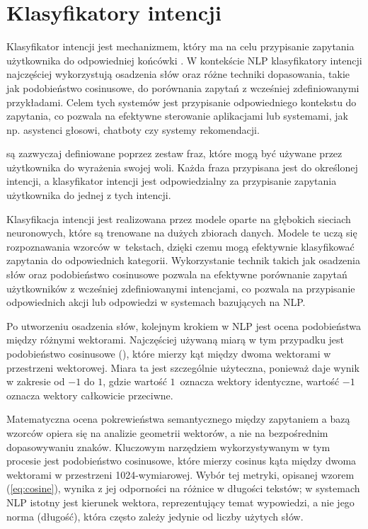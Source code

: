	\section{Klasyfikatory intencji}
	Klasyfikator intencji jest mechanizmem, który ma na celu przypisanie zapytania użytkownika do odpowiedniej końcówki \cite{aggarwal2018textbook}. W kontekście NLP klasyfikatory intencji najczęściej wykorzystują osadzenia słów oraz różne techniki dopasowania, takie jak podobieństwo cosinusowe, do porównania zapytań z wcześniej zdefiniowanymi przykładami. Celem tych systemów jest przypisanie odpowiedniego kontekstu do zapytania, co pozwala na efektywne sterowanie aplikacjami lub systemami, jak np. asystenci głosowi, chatboty czy systemy rekomendacji.
	
	 są zazwyczaj definiowane poprzez zestaw fraz, które mogą być używane przez użytkownika do wyrażenia swojej woli. Każda fraza przypisana jest do określonej intencji, a klasyfikator intencji jest odpowiedzialny za przypisanie zapytania użytkownika do jednej z tych intencji.
	
	Klasyfikacja intencji jest realizowana przez modele oparte na głębokich sieciach neuronowych, które są trenowane na dużych zbiorach danych. Modele te uczą się rozpoznawania wzorców w~tekstach, dzięki czemu mogą efektywnie klasyfikować zapytania do odpowiednich kategorii. Wykorzystanie technik takich jak osadzenia słów oraz podobieństwo cosinusowe pozwala na efektywne porównanie zapytań użytkowników z wcześniej zdefiniowanymi intencjami, co pozwala na przypisanie odpowiednich akcji lub odpowiedzi w systemach bazujących na NLP.

	Po utworzeniu osadzenia słów, kolejnym krokiem w NLP jest ocena podobieństwa między różnymi wektorami. Najczęściej używaną miarą w tym przypadku jest podobieństwo cosinusowe (), które mierzy kąt między dwoma wektorami w przestrzeni wektorowej. Miara ta jest szczególnie użyteczna, ponieważ daje wynik w zakresie od $-1$ do $1$, gdzie wartość $1$~oznacza wektory identyczne, wartość $-1$ oznacza wektory całkowicie przeciwne.

	Matematyczna ocena pokrewieństwa semantycznego między zapytaniem a bazą wzorców opiera się na analizie geometrii wektorów, a nie na bezpośrednim dopasowywaniu znaków. Kluczowym narzędziem wykorzystywanym w tym procesie jest podobieństwo cosinusowe, które mierzy cosinus kąta między dwoma wektorami w przestrzeni 1024-wymiarowej. Wybór tej metryki, opisanej wzorem (\ref{eq:cosine}), wynika z jej odporności na różnice w długości tekstów; w systemach NLP istotny jest kierunek wektora, reprezentujący temat wypowiedzi, a nie jego norma (długość), która często zależy jedynie od liczby użytych słów.

